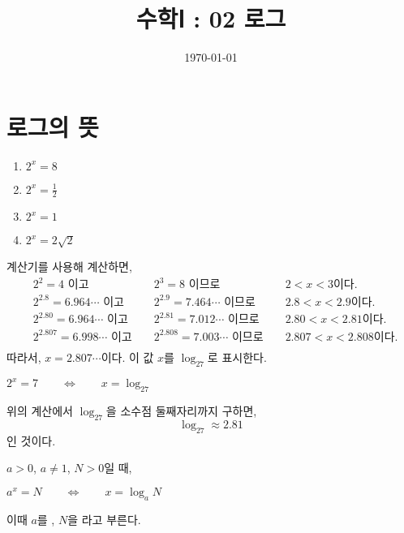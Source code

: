 \documentclass{oblivoir}
\begin{document}
\title{수학Ⅰ : 02 로그}
\author{}
\date{\today}
\maketitle
\tableofcontents
\newpage

\section{로그의 뜻}

%
\begin{enumerate}\label{log1}
\item
\(2^x=8\)
\item
\(2^x=\frac12\)
\item
\(2^x=1\)
\item
\(2^x=2\sqrt2\)
\end{enumerate}

%
\label{log2}
계산기를 사용해 계산하면,
\begin{align*}
&2^2=4				\text{ 이고 }&&2^3=8				\text{ 이므로 }&&2<x<3\text{이다.}\\
&2^{2.8}=6.964\cdots 	\text{ 이고 }&&2^{2.9}=7.464\cdots 	\text{ 이므로 }&&2.8<x<2.9\text{이다.}\\
&2^{2.80}=6.964\cdots 	\text{ 이고 }&&2^{2.81}=7.012\cdots 	\text{ 이므로 }&&2.80<x<2.81\text{이다.}\\
&2^{2.807}=6.998\cdots 	\text{ 이고 }&&2^{2.808}=7.003\cdots 	\text{ 이므로 }&&2.807<x<2.808\text{이다.}\\
\end{align*}
따라서, \(x=2.807\cdots\)이다.
이 값 \(x\)를 \(\log_27\)로 표시한다.
\begin{mdframed}[rightmargin=.2\textwidth,leftmargin=.2\textwidth]
\centering
\(2^x=7\qquad\iff\qquad x=\log_27\)
\end{mdframed}
위의 계산에서 \(\log_27\)을 소수점 둘째자리까지 구하면,
\[\log_27\approx2.81\]
인 것이다.

%
\label{log3}

\newpage
\begin{mdframed}
%
\label{log4}
\(a>0\), \(a\neq1\), \(N>0\)일 때, 
\begin{mdframed}[rightmargin=.2\textwidth,leftmargin=.2\textwidth]
\centering
\(a^x=N\qquad\iff\qquad x=\log_aN\)
\end{mdframed}
이때 \(a\)를 , \(N\)을 라고 부른다.
\end{mdframed}
\end{document}
